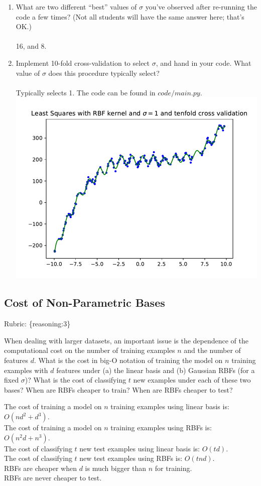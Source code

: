 \documentclass{article}
\def\rubric#1{\gre{Rubric: \{#1\}}}{}
\def\blu#1{{\color{blu}#1}}
\def\gre#1{{\color{gre}#1}}
\def\enum#1{\begin{enumerate}#1\end{enumerate}}
\begin{document}
\enum{
\item What are two different ``best'' values of $\sigma$ you've observed after re-running the code a few times? (Not all students will have the same answer here; that's OK.) \\\\
16, and 8.
\item Implement 10-fold cross-validation to select $\sigma$, and hand in your code. What value of $\sigma$ does this procedure typically select? \\\\
Typically selects 1. The code can be found in $code/main.py$.
\\ \includegraphics{../figs/least_squares_rbf_tenfold_cross_validation.pdf}
}


\subsection{Cost of Non-Parametric Bases}
\rubric{reasoning:3}

When dealing with larger datasets, an important issue is the dependence of the
computational cost on the number of training examples $n$ and the number of
features $d$. \blu{What is the cost in big-O notation of training the model
on $n$ training examples with $d$ features under (a) the linear basis and
(b) Gaussian RBFs (for a fixed $\sigma$)? What is the cost of
classifying $t$ new examples under each of these two bases? When are RBFs
cheaper to train? When are RBFs cheaper to test?}

The cost of training a model on $n$ training examples using linear basis is: $O(nd^2 + d^3)$. \\
The cost of training a model on $n$ training examples using RBFs is: $O(n^2d + n^3)$. \\
The cost of classifying $t$ new test examples using linear basis is: $O(td)$. \\
The cost of classifying $t$ new test examples using RBFs is: $O(tnd)$. \\
RBFs are cheaper when $d$ is much bigger than $n$ for training. \\
RBFs are never cheaper to test.
\end{document}
